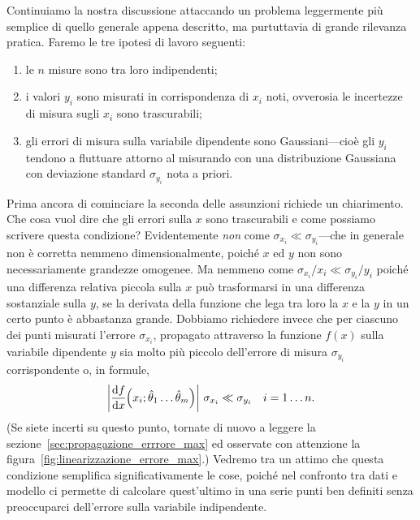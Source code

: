 Continuiamo la nostra discussione attaccando un problema leggermente più
semplice di quello generale appena descritto, ma purtuttavia di grande
rilevanza pratica. Faremo le tre ipotesi di lavoro seguenti:
\begin{enumerate}
\item le $n$ misure sono tra loro indipendenti;
\item i valori $y_i$ sono misurati in corrispondenza di $x_i$ noti, ovverosia
  le incertezze di misura sugli $x_i$ sono trascurabili;
\item gli errori di misura sulla variabile dipendente sono Gaussiani---cioè
  gli $y_i$ tendono a fluttuare attorno al misurando con una distribuzione
  Gaussiana con deviazione standard $\sigma_{y_i}$ nota a priori.
\end{enumerate}

Prima ancora di cominciare la seconda delle assunzioni richiede un chiarimento.
Che cosa vuol dire che gli errori sulla $x$ sono trascurabili e come possiamo
scrivere questa condizione? Evidentemente \emph{non} come
$\sigma_{x_i} \ll \sigma_{y_i}$---che in generale non è corretta nemmeno
dimensionalmente, poiché $x$ ed $y$ non sono necessariamente grandezze
omogenee. Ma nemmeno come $\sigma_{x_i}/x_i \ll \sigma_{y_i}/y_i$ poiché una
differenza relativa piccola sulla $x$ può trasformarsi in una differenza
sostanziale sulla $y$, se la derivata della funzione che lega tra loro la $x$ e
la $y$ in un certo punto è abbastanza grande. Dobbiamo richiedere invece che
per ciascuno dei punti misurati l'errore $\sigma_{x_i}$, propagato attraverso la
funzione $f(x)$ sulla variabile dipendente $y$ sia molto più piccolo
dell'errore di misura $\sigma_{y_i}$ corrispondente o, in formule,
\begin{align}\label{eq:condizione_dxdy}
  \abs{\td{f}{x}{x_i; \hat{\theta}_1 \ldots \hat{\theta}_m}}\,
  \sigma_{x_i} \ll \sigma_{y_i}
  \quad i = 1 \ldots n.
\end{align}
(Se siete incerti su questo punto, tornate di nuovo a leggere la
sezione~\ref{sec:propagazione_errrore_max} ed osservate con attenzione la
figura~\ref{fig:linearizzazione_errore_max}.)
Vedremo tra un attimo che questa condizione semplifica significativamente le
cose, poiché nel confronto tra dati e modello ci permette di calcolare
quest'ultimo in una serie punti ben definiti senza preoccuparci dell'errore
sulla variabile indipendente.

\begin{figure}[htb!]
\end{figure}

